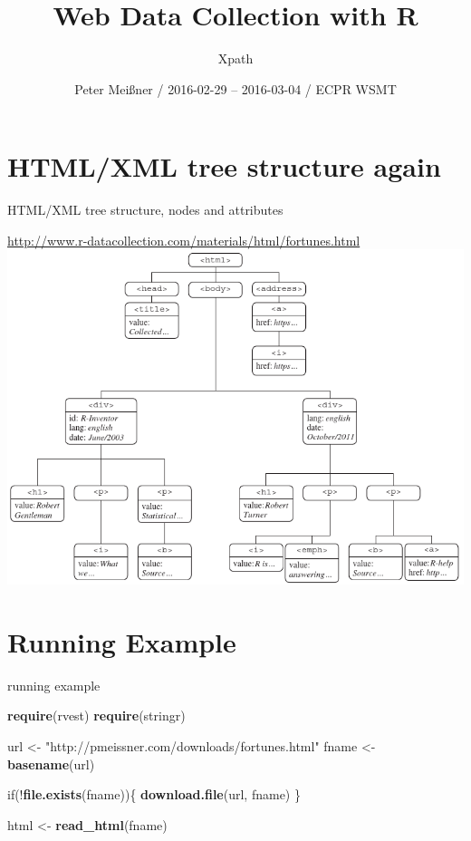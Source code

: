 \documentclass[ignorenonframetext,]{beamer}
\title{Web Data Collection with R}
\subtitle{Xpath}
\author{Peter Meißner / 2016-02-29 -- 2016-03-04 / ECPR WSMT}
\date{}
\newenvironment{Shaded}{\begin{snugshade}}{\end{snugshade}}
\newcommand{\KeywordTok}[1]{\textcolor[rgb]{0.13,0.29,0.53}{\textbf{{#1}}}}
\newcommand{\StringTok}[1]{\textcolor[rgb]{0.31,0.60,0.02}{{#1}}}
\newcommand{\NormalTok}[1]{{#1}}
\begin{document}
\frame{\titlepage}

\begin{frame}
\tableofcontents[hideallsubsections]
\end{frame}

\section{HTML/XML tree structure
again}\label{htmlxml-tree-structure-again}

\begin{frame}{HTML/XML tree structure, nodes and attributes}

\url{http://www.r-datacollection.com/materials/html/fortunes.html}
\includegraphics{tree.png}

\end{frame}

\section{Running Example}\label{running-example}

\begin{frame}[fragile]{running example}

\begin{Shaded}
\begin{Highlighting}[]
\KeywordTok{require}\NormalTok{(rvest)}
\KeywordTok{require}\NormalTok{(stringr)}
\end{Highlighting}
\end{Shaded}

\begin{Shaded}
\begin{Highlighting}[]
\NormalTok{url <-}\StringTok{ }
\StringTok{"http://pmeissner.com/downloads/fortunes.html"}
\NormalTok{fname <-}\StringTok{ }\KeywordTok{basename}\NormalTok{(url)}

\NormalTok{if(!}\KeywordTok{file.exists}\NormalTok{(fname))\{}
  \KeywordTok{download.file}\NormalTok{(url, fname)}
\NormalTok{\}}

\NormalTok{html <-}\StringTok{ }\KeywordTok{read_html}\NormalTok{(fname)}
\end{Highlighting}
\end{Shaded}

\end{frame}
\end{document}
